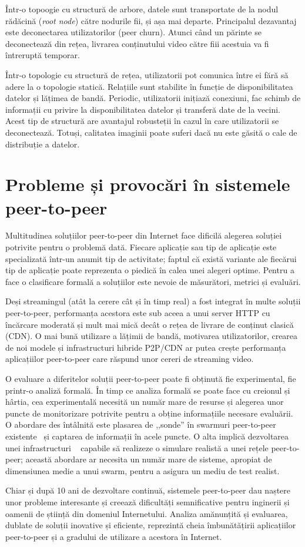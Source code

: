 Într-o topoogie cu structură de arbore, datele sunt transportate de la nodul
rădăcină (\textit{root node}) către nodurile fii, și așa mai departe.
Principalul dezavantaj este deconectarea utilizatorilor (peer churn). Atunci
când un părinte se deconectează din rețea, livrarea conținutului video către
fiii acestuia va fi întreruptă temporar.

Într-o topologie cu structură de rețea, utilizatorii pot comunica între ei
fără să adere la o topologie statică. Relațiile sunt stabilite în funcție de
disponibilitatea datelor și lățimea de bandă. Periodic, utilizatorii inițiază
conexiuni, fac schimb de informații cu privire la disponibilitatea datelor și
transferă date de la vecini. Acest tip de structură are avantajul robusteții
în cazul în care utilizatorii se deconectează. Totuși, calitatea imaginii poate
suferi dacă nu este găsită o cale de distribuție a datelor.

\section{Probleme și provocări în sistemele peer-to-peer}
\label{sec:p2p-systems:issues}

Multitudinea soluțiilor peer-to-peer din Internet face dificilă alegerea
soluției potrivite pentru o problemă dată. Fiecare aplicație sau tip de
aplicație este specializată într-un anumit tip de activitate; faptul că
există variante ale fiecărui tip de aplicație poate reprezenta o piedică în
calea unei alegeri optime. Pentru a face o clasificare formală a soluțiilor
este nevoie de măsurători, metrici și evaluări.

Deși streamingul (atât la cerere cât și în timp real) a fost integrat în multe
soluții peer-to-peer, performanța acestora este sub aceea a unui server HTTP
cu încărcare moderată și mult mai mică decât o rețea de livrare de conținut
clasică (CDN). O mai bună utilizare a lățimii de bandă, motivarea
utilizatorilor, crearea de noi modele și infrastructuri hibride P2P/CDN ar putea
crește performanța aplicațiilor peer-to-peer care răspund unor cereri de
streaming video.

O evaluare a diferitelor soluții peer-to-peer poate fi obținută fie
experimental, fie printr-o analiză formală. În timp ce analiza formală se
poate face cu creionul și hârtia, cea experimentală necesită un număr mare de
resurse și alegerea unor puncte de monitorizare potrivite pentru a obține
informațiile necesare evaluării. O abordare des întâlnită este plasarea de
,,sonde'' în swarmuri peer-to-peer existente~\cite{corr-overlay} și captarea
de informații în acele puncte. O alta implică dezvoltarea unei infrastructuri
~\cite{bt-vi} capabile să realizeze o simulare realistă a unei rețele
peer-to-peer; această abordare ar necesita un număr mare de sisteme, apropiat
de dimensiunea medie a unui swarm, pentru a asigura un mediu de test realist.

Chiar și după 10 ani de dezvoltare continuă, sistemele peer-to-peer dau naștere
unor probleme interesante și creează dificultăți semnificative pentru
inginerii și oamenii de știință din domeniul Internetului. Analiza
amănunțită și evaluarea, dublate de soluții inovative și eficiente, reprezintă
cheia îmbunătățirii aplicațiilor peer-to-peer și a gradului de utilizare
a acestora în Internet.
